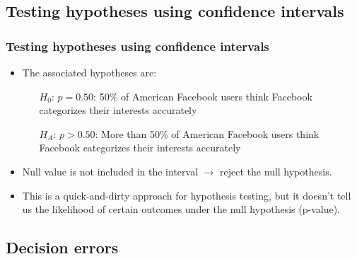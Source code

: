 
 \subsection{Testing hypotheses using confidence intervals} 
 
 
\begin{frame}
\frametitle{Testing hypotheses using confidence intervals}
 
{\small {}}
 
\pause
 
\begin{itemize}
 
\item The associated hypotheses are:
\begin{itemize}
\item[$H_0$:] $p = 0.50$: 50\% of American Facebook users think Facebook categorizes their interests accurately
\item[$H_A$:] $p > 0.50$: More than 50\% of American Facebook users think Facebook categorizes their interests accurately
\end{itemize}
 
\pause
 
\item Null value is not included in the interval $\rightarrow$ reject the null hypothesis.
 
\pause
 
\item This is a quick-and-dirty approach for hypothesis testing, but it doesn't tell us the likelihood of certain outcomes under the null hypothesis (p-value).
 
\end{itemize}
 
\end{frame}
 

\subsection{Decision errors}

